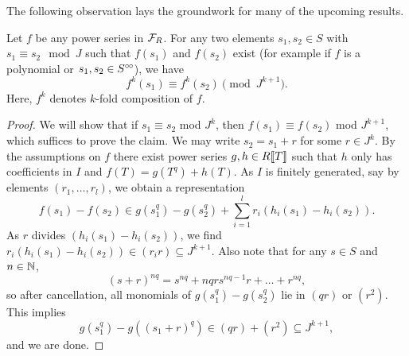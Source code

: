 \documentclass[../main.tex]{subfiles}
\begin{document}
The following observation lays the groundwork for many of the upcoming results.
\begin{lem}\label{lem:cryscalc}
  Let $f$ be any power series in $\mathcal{F}_R$. For any two elements $s_1,s_2 \in S$ 
  with $s_1 \equiv s_2 \mod J$ such that $f(s_1)$ and $f(s_2)$ exist (for
  example if $f$ is a polynomial or $s_1, s_2 \in S^{\circ \hspace{-0.5pt} \circ}$), we have 
  \begin{equation*}
    f^k(s_1) \equiv f^k(s_2) \pmod {J^{k+1}}.
  \end{equation*}
  Here, $f^k$ denotes $k$-fold composition of $f$.
\begin{proof}
  We will show that if $s_1 \equiv s_2$ mod $J^k$, then $f(s_1) \equiv f(s_2)$ mod 
  $J^{k+1}$, which suffices to prove the claim. 
  We may write $s_2 = s_1 + r$ for some $r\in J^k$. By the assumptions on $f$
  there exist power series 
  $g,h \in R\llbracket T \rrbracket$ such that $h$ only
  has coefficients in $I$ and $f(T) = g(T^q) + h(T)$. As $I$ is finitely generated,
  say by elements $(r_1, \dots, r_l)$, we obtain a representation 
  \begin{equation*}
    f(s_1) - f(s_2) \in g(s_1^{q})-g(s_2^{q}) + \sum_{i=1}^l r_i \left(h_i(s_1) -
    h_i(s_2)\right).
  \end{equation*}
  As $r$ divides $\left(h_i(s_1) - h_i(s_2)\right)$, we find
  $r_i(h_i(s_1) - h_i(s_2)) \in (r_i r) \subseteq J^{k+1}$. Also note that 
  for any $s\in S$ and $n \in \mathbb{N}$, 
  $$(s+r)^{nq} = s^{nq} + nqrs^{nq-1}r + \dots + r^{nq},$$
  so after cancellation, all monomials of $g(s_1^q) - g(s_2^q)$ lie in
  $(qr)$ or $(r^2)$. This implies
  \begin{equation*}
    g(s_1^q) - g\left((s_1+r)^q\right) \in (qr) + (r^2) \subseteq J^{k+1},
  \end{equation*}
  and we are done.
\end{proof}
\end{lem}
\end{document}
